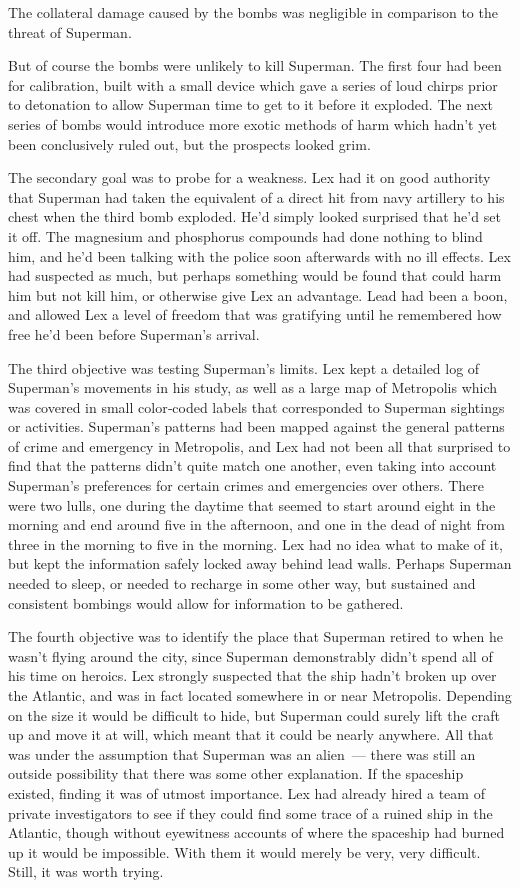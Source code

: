 \documentclass[ebook,12pt]{memoir}
\begin{document}
The collateral damage caused by the bombs was negligible in comparison
to the threat of Superman.

But of course the bombs were unlikely to kill Superman. The first four
had been for calibration, built with a small device which gave a series
of loud chirps prior to detonation to allow Superman time to get to it
before it exploded. The next series of bombs would introduce more exotic
methods of harm which hadn't yet been conclusively ruled out, but the
prospects looked grim.

The secondary goal was to probe for a weakness. Lex had it on good
authority that Superman had taken the equivalent of a direct hit from
navy artillery to his chest when the third bomb exploded. He'd simply
looked surprised that he'd set it off. The magnesium and phosphorus
compounds had done nothing to blind him, and he'd been talking with the
police soon afterwards with no ill effects. Lex had suspected as much,
but perhaps something would be found that could harm him but not kill
him, or otherwise give Lex an advantage. Lead had been a boon, and
allowed Lex a level of freedom that was gratifying until he remembered
how free he'd been before Superman's arrival.

The third objective was testing Superman's limits. Lex kept a detailed
log of Superman's movements in his study, as well as a large map of
Metropolis which was covered in small color‐coded labels that
corresponded to Superman sightings or activities. Superman's patterns
had been mapped against the general patterns of crime and emergency in
Metropolis, and Lex had not been all that surprised to find that the
patterns didn't quite match one another, even taking into account
Superman's preferences for certain crimes and emergencies over others.
There were two lulls, one during the daytime that seemed to start around
eight in the morning and end around five in the afternoon, and one in
the dead of night from three in the morning to five in the morning. Lex
had no idea what to make of it, but kept the information safely locked
away behind lead walls. Perhaps Superman needed to sleep, or needed to
recharge in some other way, but sustained and consistent bombings would
allow for information to be gathered.

The fourth objective was to identify the place that Superman retired to
when he wasn't flying around the city, since Superman demonstrably
didn't spend all of his time on heroics. Lex strongly suspected that the
ship hadn't broken up over the Atlantic, and was in fact located
somewhere in or near Metropolis. Depending on the size it would be
difficult to hide, but Superman could surely lift the craft up and move
it at will, which meant that it could be nearly anywhere. All that was
under the assumption that Superman was an alien~--- there was still an
outside possibility that there was some other explanation. If the
spaceship existed, finding it was of utmost importance. Lex had already
hired a team of private investigators to see if they could find some
trace of a ruined ship in the Atlantic, though without eyewitness
accounts of where the spaceship had burned up it would be impossible.
With them it would merely be very, very difficult. Still, it was worth
trying.
\end{document}
